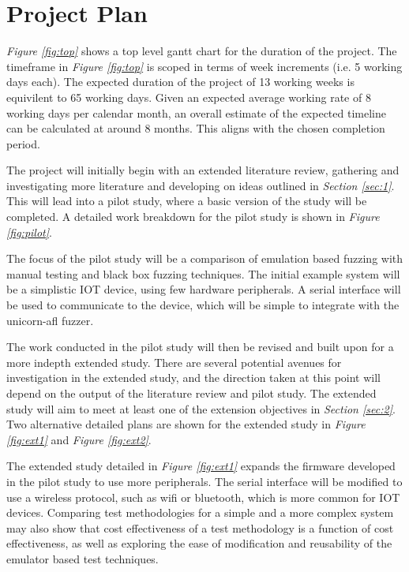 \documentclass[11pt]{article}
\begin{document}
\pagebreak
\section{Project Plan} \label{sec:3}

\textit{Figure \ref{fig:top}} shows a top level gantt chart for the duration of
the project. The timeframe in \textit{Figure \ref{fig:top}} is scoped in terms
of week increments (i.e. 5 working days each). The expected duration of the
project of 13 working weeks is equivilent to 65 working days. Given an expected
average working rate of 8 working days per calendar month, an overall estimate
of the expected timeline can be calculated at around 8 months. This aligns with
the chosen completion period.

The project will initially begin with an extended literature
review, gathering and investigating more literature and developing on ideas
outlined in \textit{Section \ref{sec:1}}. This will lead into a pilot study,
where a basic version of the study will be completed. A detailed work breakdown
for the pilot study is shown in \textit{Figure \ref{fig:pilot}}.

The focus of the pilot study will be a comparison of emulation based fuzzing
with manual testing and black box fuzzing techniques. The initial example system will
be a simplistic IOT device, using few hardware peripherals. A serial interface
will be used to communicate to the device, which will be simple to integrate
with the unicorn-afl fuzzer.

The work conducted in the pilot study will then be revised and built upon for a
more indepth extended study. There are several potential avenues for
investigation in the extended study, and the direction taken at this point will
depend on the output of the literature review and pilot study. The extended
study will aim to meet at least one of the extension objectives in
\textit{Section \ref{sec:2}}. Two alternative detailed plans are shown for the
extended study in \textit{Figure \ref{fig:ext1}} and \textit{Figure
\ref{fig:ext2}}.

The extended study detailed in \textit{Figure \ref{fig:ext1}} expands the
firmware developed in the pilot study to use more peripherals. The serial
interface will be modified to use a wireless protocol, such as wifi or
bluetooth, which is more common for IOT devices. Comparing test methodologies
for a simple and a more complex system may also show that cost effectiveness of
a test methodology is a function of cost effectiveness, as well as exploring
the ease of modification and reusability of the emulator based test
techniques.
\end{document}
